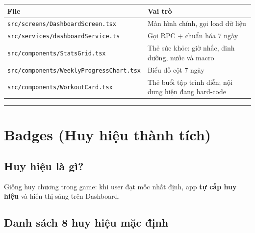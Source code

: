 \documentclass[12pt,a4paper]{article}
\newcounter{none}
\begin{document}
{\def\LTcaptype{none} %
\begin{longtable}[]{@{}
  >{\raggedright\arraybackslash}p{}
  >{\raggedright\arraybackslash}p{}@{}}
\toprule\noalign{}
\begin{minipage}[b]{\linewidth}\raggedright
File
\end{minipage} & \begin{minipage}[b]{\linewidth}\raggedright
Vai trò
\end{minipage} \\
\midrule\noalign{}
\endhead
\bottomrule\noalign{}
\endlastfoot
\texttt{src/screens/DashboardScreen.tsx} & Màn hình chính, gọi load dữ
liệu \\
\texttt{src/services/dashboardService.ts} & Gọi RPC + chuẩn hóa 7
ngày \\
\texttt{src/components/StatsGrid.tsx} & Thẻ sức khỏe: giờ nhắc, dinh
dưỡng, nước và macro \\
\texttt{src/components/WeeklyProgressChart.tsx} & Biểu đồ cột 7 ngày \\
\texttt{src/components/WorkoutCard.tsx} & Thẻ buổi tập trình diễn; nội
dung hiện đang hard-code \\
\end{longtable}
}

\begin{center}\rule{0.5\linewidth}{0.5pt}\end{center}

\section{Badges (Huy hiệu thành
tích)}\label{badges-huy-hiux1ec7u-thuxe0nh-tuxedch}

\subsection{Huy hiệu là gì?}\label{huy-hiux1ec7u-luxe0-guxec}

Giống huy chương trong game: khi user đạt mốc nhất định, app \textbf{tự
cấp huy hiệu} và hiển thị sáng trên Dashboard.

\subsection{Danh sách 8 huy hiệu mặc
định}\label{danh-suxe1ch-8-huy-hiux1ec7u-mux1eb7c-ux111ux1ecbnh}
\end{document}
